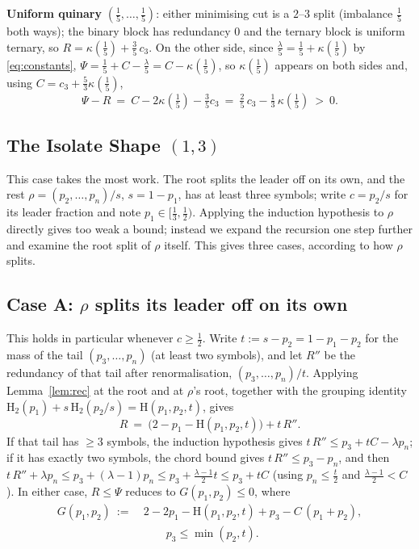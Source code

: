 \documentclass[journal]{IEEEtran}
\theoremstyle{definition}
\newcommand{\Hh}{\mathrm H_2}
\newcommand{\kp}{\kappa}
\newcommand{\CC}{C}
\newcommand{\lam}{\lambda}
\newcommand{\cthree}{c_3}
\begin{document}
\textbf{Uniform quinary} $(\tfrac15,\dots,\tfrac15)$: either minimising cut is a
$2$--$3$ split (imbalance $\tfrac15$ both ways); the binary block has
redundancy $0$ and the ternary block is uniform ternary, so
$R=\kp(\tfrac15)+\tfrac35\,\cthree$. On the other side, since
$\tfrac{\lam}5=\tfrac15+\kp(\tfrac15)$ by \eqref{eq:constants},
$\Psi=\tfrac15+\CC-\tfrac{\lam}5=\CC-\kp(\tfrac15)$, so $\kp(\tfrac15)$
appears on both sides and, using $\CC=\cthree+\tfrac53\kp(\tfrac15)$,
\[
  \Psi-R\ =\ \CC-2\kp(\tfrac15)-\tfrac35\cthree
  \ =\ \tfrac25\,\cthree-\tfrac13\,\kp(\tfrac15)
  \ >\ 0.
\]

\subsection{The Isolate Shape $(1,3)$}\label{sec:onethree}

This case takes the most work. The root splits the leader off on its own, and the rest
$\rho=(p_2,\dots,p_n)/s$, $s=1-p_1$, has at least three symbols; write $c=p_2/s$
for its leader fraction and note $p_1\in[\tfrac13,\tfrac12)$. Applying
the induction hypothesis to $\rho$ directly gives too weak a bound; instead we
expand the recursion one step further and examine the root split of $\rho$
itself. This gives three cases, according to how $\rho$ splits.

\subsection*{Case A: $\rho$ splits its leader off on its own}

This holds in particular whenever $c\ge\tfrac12$. Write $t:=s-p_2=1-p_1-p_2$
for the mass of the tail $(p_3,\dots,p_n)$ (at least two symbols), and let $R''$
be the redundancy of that tail after renormalisation, $(p_3,\dots,p_n)/t$.
Applying Lemma~\ref{lem:rec} at the root and at $\rho$'s root, together with the
grouping identity $\Hh(p_1)+s\,\Hh(p_2/s)=\mathrm H(p_1,p_2,t)$, gives
\begin{equation}\label{eq:2level}
  R\ =\ \bigl(2-p_1-\mathrm H(p_1,p_2,t)\bigr)+t\,R'' .
\end{equation}
If that tail has $\ge3$ symbols, the
induction hypothesis gives $t\,R''\le p_3+t\CC-\lam p_n$; if it has exactly
two symbols, the chord bound gives $t\,R''\le p_3-p_n$, and then
$t\,R''+\lam p_n\le p_3+(\lam-1)p_n\le p_3+\tfrac{\lam-1}2t\le p_3+t\CC$
(using $p_n\le\tfrac t2$ and $\tfrac{\lam-1}2<\CC$). In
either case, $R\le\Psi$ reduces to $G(p_1,p_2)\le0$, where
\[
\begin{aligned}
  G(p_1,p_2)\ :=\ &2-2p_1-\mathrm H(p_1,p_2,t)+p_3-\CC\,(p_1+p_2),\\
  &\qquad p_3\le\min(p_2,t).
\end{aligned}
\]
\end{document}
